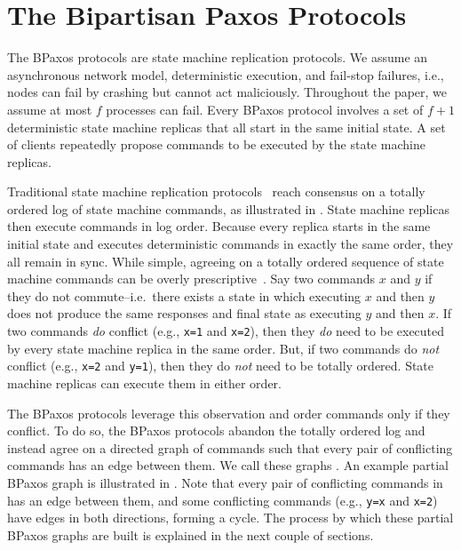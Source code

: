 \section{The Bipartisan Paxos Protocols}
The BPaxos protocols are state machine replication protocols. We assume an
asynchronous network model, deterministic execution, and fail-stop failures,
i.e., nodes can fail by crashing but cannot act maliciously. Throughout the
paper, we assume at most $f$ processes can fail. Every BPaxos protocol involves
a set of $f + 1$ deterministic state machine replicas that all start in the
same initial state. A set of clients repeatedly propose commands to be executed
by the state machine replicas.



Traditional state machine replication protocols~\cite{liskov2012viewstamped,
lamport1998part} reach consensus on a totally ordered log of state machine
commands, as illustrated in . State machine replicas then
execute commands in log order. Because every replica starts in the same initial
state and executes deterministic commands in exactly the same order,
they all remain in sync.
%
While simple, agreeing on a totally ordered sequence of state machine commands
can be overly prescriptive~\cite{lamport2005generalized, moraru2013there}. Say
two commands $x$ and $y$  if they do not commute--i.e.\ there
exists a state in which executing $x$ and then $y$ does not produce the same
responses and final state as executing $y$ and then $x$. If two commands
\emph{do} conflict (e.g., \texttt{x=1} and \texttt{x=2}), then they \emph{do}
need to be executed by every state machine replica in the same order.  But, if
two commands do \emph{not} conflict (e.g., \texttt{x=2} and \texttt{y=1}), then
they do \emph{not} need to be totally ordered. State machine replicas can
execute them in either order.

The BPaxos protocols leverage this observation and order commands only if they
conflict. To do so, the BPaxos protocols abandon the totally ordered log and
instead agree on a directed graph of commands such that every pair of
conflicting commands has an edge between them. We call these graphs
. An example partial BPaxos graph is illustrated
in . Note that every pair of conflicting commands in
 has an edge between them, and some conflicting commands
(e.g., \texttt{y=x} and \texttt{x=2}) have edges in both directions, forming a
cycle. The process by which these partial BPaxos graphs are built is explained
in the next couple of sections.

